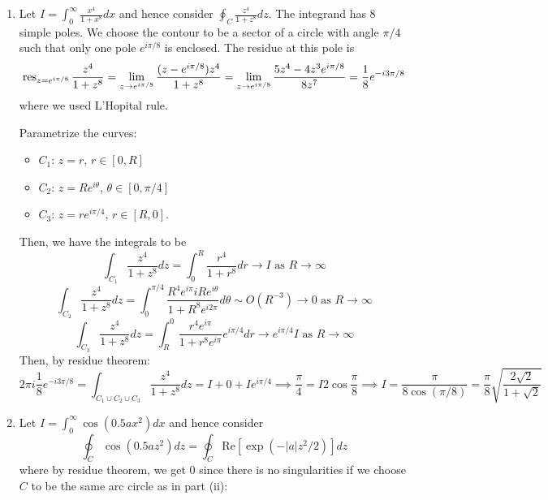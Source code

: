 \documentclass[a4paper]{article}
\begin{document}
\begin{ans}
\begin{enumerate}[label=(\roman*)]
\begin{center}
\begin{tikzpicture}
    \end{tikzpicture}
  \end{center}
\item Let $I=\int_0^\infty\frac{x^4}{1+x^8}dx$ and hence consider $\oint_C\frac{z^4}{1+z^8}dz$. The integrand has 8 simple poles. We choose the contour to be a sector of a circle with angle $\pi/4$ such that only one pole $e^{i\pi/8}$ is enclosed. The residue at this pole is
$$\res_{z=e^{i\pi/8}}\frac{z^4}{1+z^8}=\lim_{z\rightarrow e^{i\pi/8}}\frac{(z-e^{i\pi/8})z^4}{1+z^8}=\lim_{z\rightarrow e^{i\pi/8}}\frac{5z^4-4z^3e^{i\pi/8}}{8z^7}=\frac{1}{8}e^{-i3\pi/8}$$
where we used L'Hopital rule.
 \begin{center}
  \end{center}
Parametrize the curves: 
\begin{itemize}
    \item $C_1$: $z=r$, $r\in[0,R]$
    \item $C_2$: $z=Re^{i\theta}$, $\theta\in[0,\pi/4]$
    \item $C_3$: $z=re^{i\pi/4}$, $r\in[R,0]$.
\end{itemize}
Then, we have the integrals to be
$$\int_{C_1}\frac{z^4}{1+z^8}dz=\int_0^R\frac{r^4}{1+r^8}dr\rightarrow I\text{ as }R\rightarrow\infty$$
$$\int_{C_2}\frac{z^4}{1+z^8}dz=\int_0^{\pi/4}\frac{R^4e^{i\pi}iRe^{i\theta}}{1+R^8e^{i2\pi}}d\theta\sim O(R^{-3})\rightarrow 0\text{ as }R\rightarrow\infty$$
$$\int_{C_3}\frac{z^4}{1+z^8}dz=\int_R^0\frac{r^4e^{i\pi}}{1+r^8e^{i\pi}}e^{i\pi/4}dr\rightarrow e^{i\pi/4} I\text{ as }R\rightarrow\infty$$
Then, by residue theorem:
$$2\pi i\frac{1}{8}e^{-i3\pi/8}=\int_{C_1\cup C_2\cup C_3}\frac{z^4}{1+z^8}dz=I+0+Ie^{i\pi/4}\implies\frac{\pi}{4}=I2\cos\frac{\pi}{8}\implies I=\frac{\pi}{8\cos(\pi/8)}
=\frac{\pi}{8}\sqrt{\frac{2\sqrt{2}}{1+\sqrt{2}}}$$
\item Let $I=\int_0^\infty\cos(0.5ax^2)dx$ and hence consider 
$$\oint_C\cos(0.5az^2)dz=\oint_C\text{Re}[\exp(-|a|z^2/2)]dz$$
where by residue theorem, we get 0 since there is no singularities if we choose $C$ to be the same arc circle as in part (ii):

\end{enumerate}
\end{ans}
\end{document}
